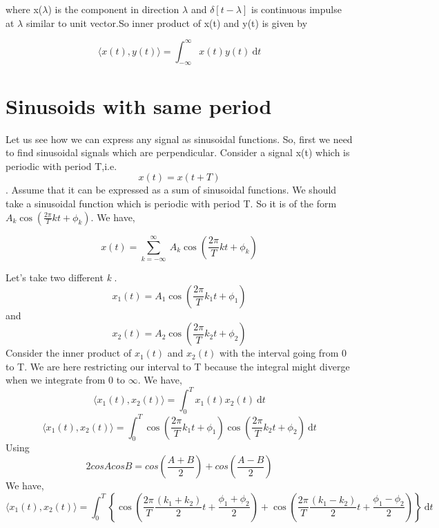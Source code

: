              where x($\lambda$) is the component in direction $\lambda$ and $\delta[t-\lambda]$ is continuous impulse at $\lambda$ similar to unit vector.So inner product of x(t) and y(t) is given by
             
           \begin{equation*} \langle x(t),y(t) \rangle = \int_{-\infty}^{\infty} \! x(t)y(t) \ \mathrm{d} t\end{equation*}
             
 \section{Sinusoids with same period}
          Let us see how we can express any signal as sinusoidal functions. So, first we need to find sinusoidal signals which are perpendicular. Consider a signal x(t) which is periodic with period T,i.e. \begin{equation*}  x(t) = x(t+T)\end{equation*}. Assume that it can be expressed as a sum of sinusoidal functions. We should take a sinusoidal function which is periodic with period T. So it is of the form $A_k\cos (\frac{2\pi}{T}kt + \phi_k)$. We have,
          
          \begin{equation*}x(t) = \sum_{k=-\infty}^{\infty}\ A_k\cos (\frac{2\pi}{T}kt + \phi_k)\end{equation*}
          
          Let's take two different \textit{k}
.  \begin{equation*}
x_1 (t) = A_1 \cos (\frac{2\pi}{T}k_1t + \phi_1)
\end{equation*}
           and \begin{equation*}
x_2 (t) = A_2 \cos (\frac{2\pi}{T}k_2t + \phi_2)
\end{equation*}
          Consider the inner product of $x_1(t)$ and $x_2(t)$ with the interval going from 0 to T. We are here restricting our interval to T because the integral might diverge when we integrate from 0 to $\infty$. We have,
           \begin{equation*}\langle x_1(t),x_2(t) \rangle = \int_{0}^{T} \! x_1(t)x_2(t) \ \mathrm{d}t\end{equation*}
           \begin{equation*}\langle x_1 (t),x_2 (t) \rangle = \int_{0}^{T} \! \cos (\frac{2\pi}{T}k_1t + \phi_1) \cos (\frac{2\pi}{T}k_2t + \phi_2) \ \mathrm{d}t\end{equation*}
           Using 
          \begin{equation*} 2cosAcosB = cos(\frac{A+B}{2}) + cos(\frac{A-B}{2})\end{equation*}
          We have,
          \begin{equation*}\langle x_1 (t),x_2 (t) \rangle = \int_{0}^{T} \! \left\lbrace \cos (\frac{2\pi}{T}\frac{(k_1+k_2)}{2}t + \frac{\phi_1+\phi_2}{2}) + \cos (\frac{2\pi}{T}\frac{(k_1-k_2)}{2}t + \frac{\phi_1-\phi_2}{2}) \right\rbrace \ \mathrm{d}t \end{equation*}
          
